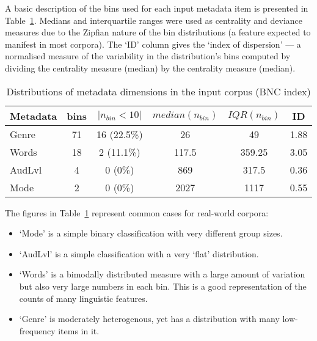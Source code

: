 A basic description of the bins used for each input metadata item is presented in Table~\ref{table:evaluation:resampling:inputdist}.  Medians and interquartile ranges were used as centrality and deviance measures due to the Zipfian nature of the bin distributions (a feature expected to manifest in most corpora).  The `ID' column gives the `index of dispersion' --- a normalised measure of the variability in the distribution's bins computed by dividing the centrality measure (median) by the centrality measure (median).

\begin{table}[Ht]
    \centering

    \begin{tabular}{ |l|c|c|c|c|c| }
        \hline
        Metadata & bins & $|n_{bin} < 10|$ & $median(n_{bin})$ & $IQR(n_{bin})$ & ID  \\
        \hline
        Genre & 71  & 16 (22.5\%)   & 26    & 49        & 1.88    \\
        Words & 18  & 2 (11.1\%)    & 117.5 & 359.25    & 3.05    \\
        AudLvl& 4   & 0 (0\%)       & 869   & 317.5     & 0.36    \\
        Mode  & 2   & 0 (0\%)       & 2027  & 1117      & 0.55    \\
        \hline
    \end{tabular}
    \caption{Distributions of metadata dimensions in the input corpus (BNC index)}
    \label{table:evaluation:resampling:inputdist}
\end{table}

The figures in Table~\ref{table:evaluation:resampling:inputdist} represent common cases for real-world corpora:

\begin{itemize}
    \item `Mode' is a simple binary classification with very different group sizes.
    \item `AudLvl' is a simple classification with a very `flat' distribution.
    \item `Words' is a bimodally distributed measure with a large amount of variation but also very large numbers in each bin.  This is a good representation of the counts of many linguistic features.
    \item `Genre' is moderately heterogenous, yet has a distribution with many low-frequency items in it.
\end{itemize}

